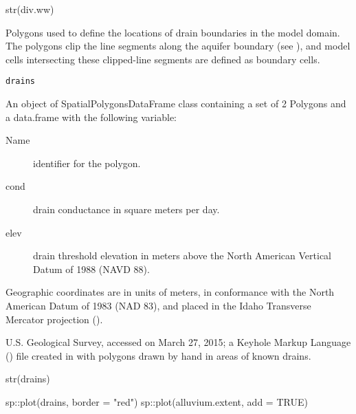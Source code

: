 \documentclass[a4paper]{book}
\begin{document}
%
\begin{Examples}
\begin{ExampleCode}
str(div.ww)

\end{ExampleCode}
\end{Examples}
%
\begin{Description}\relax
Polygons used to define the locations of drain boundaries in the model domain.
The polygons clip the line segments along the aquifer boundary (see ),
and model cells intersecting these clipped-line segments are defined as boundary cells.
\end{Description}
%
\begin{Usage}
\begin{verbatim}
drains
\end{verbatim}
\end{Usage}
%
\begin{Format}
An object of SpatialPolygonsDataFrame class containing a set of 2 Polygons and
a data.frame with the following variable:
\begin{description}

\item[Name] identifier for the polygon.
\item[cond] drain conductance in square meters per day.
\item[elev] drain threshold elevation in meters above the
North American Vertical Datum of 1988 (NAVD 88).

\end{description}

Geographic coordinates are in units of meters, in conformance with the
North American Datum of 1983 (NAD 83), and placed in the
Idaho Transverse Mercator projection ().
\end{Format}
%
\begin{Source}\relax
U.S. Geological Survey, accessed on March 27, 2015;
a Keyhole Markup Language () file created in
 with polygons drawn by hand in
areas of known drains.
\end{Source}
%
\begin{Examples}
\begin{ExampleCode}
str(drains)

sp::plot(drains, border = "red")
sp::plot(alluvium.extent, add = TRUE)

\end{ExampleCode}
\end{Examples}
\end{document}
